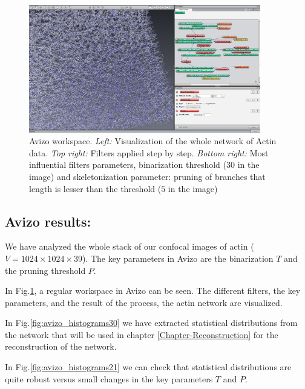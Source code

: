 \begin{figure}[h]

 
\includegraphics[width=0.9\textwidth]{Figures/chapter-image/avizo/workspace-wholedata.png}%

\caption[Avizo image: Actin network visualization and workspace]{Avizo
workspace. \emph{Left:} Visualization of the whole network of Actin data.
\emph{Top right:} Filters applied step by step. \emph{Bottom right:} Most
influential filters parameters, binarization threshold ($30$ in the image) and
skeletonization parameter: pruning of branches that length is lesser than the
threshold ($5$ in the image)}
\label{fig:avizo_workspace}
\end{figure}


\subsection{Avizo results:}
We have analyzed the whole stack of our confocal images of actin
($V=1024\times1024\times39$). The key parameters in Avizo are the binarization
$T$ and the pruning threshold $P$.

In Fig.\ref{fig:avizo_workspace}, a regular workspace in Avizo can be seen. The
different filters, the key parameters, and the result of the process, the actin
network are visualized.

In Fig.\ref{fig:avizo_histograms30} we have extracted statistical distributions
from the network that will be used in chapter \ref{Chapter-Reconstruction} for
the reconstruction of the network. 

In Fig.\ref{fig:avizo_histograms21} we can check that statistical distributions
are quite robust versus small changes in the key parameters $T$ and $P$.


